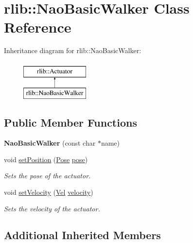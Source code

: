 \hypertarget{classrlib_1_1NaoBasicWalker}{\section{rlib\-:\-:Nao\-Basic\-Walker Class Reference}
\label{classrlib_1_1NaoBasicWalker}
}
Inheritance diagram for rlib\-:\-:Nao\-Basic\-Walker\-:\begin{figure}[H]
\begin{center}
\leavevmode
\includegraphics[height=2.000000cm]{classrlib_1_1NaoBasicWalker}
\end{center}
\end{figure}
\subsection*{Public Member Functions}
\begin{DoxyCompactItemize}
\item 
\hypertarget{classrlib_1_1NaoBasicWalker_a43bdf705d8aeb9cdd8638cee899303b3}{{\bfseries Nao\-Basic\-Walker} (const char $\ast$name)}\label{classrlib_1_1NaoBasicWalker_a43bdf705d8aeb9cdd8638cee899303b3}

\item 
void \hyperlink{classrlib_1_1NaoBasicWalker_a282dc6e13898cb72b01fbf5b133efeed}{set\-Position} (\hyperlink{classrlib_1_1Pose}{Pose} \hyperlink{classrlib_1_1Actuator_adcce3f106abc4127382d0d9794bb7b15}{pose})
\begin{DoxyCompactList}\small\item\em Sets the pose of the actuator. \end{DoxyCompactList}\item 
void \hyperlink{classrlib_1_1NaoBasicWalker_adb9b1a9c71e0558ba57384f6b8385e1a}{set\-Velocity} (\hyperlink{classrlib_1_1Vel}{Vel} \hyperlink{classrlib_1_1Actuator_a27372af2dd629e7b434eb541de0a13a8}{velocity})
\begin{DoxyCompactList}\small\item\em Sets the velocity of the actuator. \end{DoxyCompactList}\end{DoxyCompactItemize}
\subsection*{Additional Inherited Members}


